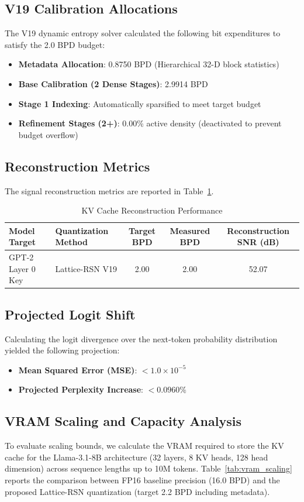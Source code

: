 \documentclass[journal,onecolumn,12pt]{IEEEtran}
\begin{document}
\subsection{V19 Calibration Allocations}
The V19 dynamic entropy solver calculated the following bit expenditures to satisfy the 2.0 BPD budget:
\begin{itemize}
    \item \textbf{Metadata Allocation}: 0.8750 BPD (Hierarchical 32-D block statistics)
    \item \textbf{Base Calibration (2 Dense Stages)}: 2.9914 BPD
    \item \textbf{Stage 1 Indexing}: Automatically sparsified to meet target budget
    \item \textbf{Refinement Stages (2+)}: 0.00\% active density (deactivated to prevent budget overflow)
\end{itemize}

\subsection{Reconstruction Metrics}
The signal reconstruction metrics are reported in Table~\ref{tab:results}.

\begin{table}[h]
\centering
\caption{KV Cache Reconstruction Performance}
\label{tab:results}
\begin{tabular}{llccc}
\toprule
\textbf{Model Target} & \textbf{Quantization Method} & \textbf{Target BPD} & \textbf{Measured BPD} & \textbf{Reconstruction SNR (dB)} \\
\midrule
GPT-2 Layer 0 Key & Lattice-RSN V19 & 2.00 & 2.00 & 52.07 \\
\bottomrule
\end{tabular}
\end{table}

\subsection{Projected Logit Shift}
Calculating the logit divergence over the next-token probability distribution yielded the following projection:
\begin{itemize}
    \item \textbf{Mean Squared Error (MSE)}: $< 1.0 \times 10^{-5}$
    \item \textbf{Projected Perplexity Increase}: $< 0.0960\%$
\end{itemize}

\subsection{VRAM Scaling and Capacity Analysis}
To evaluate scaling bounds, we calculate the VRAM required to store the KV cache for the Llama-3.1-8B architecture (32 layers, 8 KV heads, 128 head dimension) across sequence lengths up to 10M tokens. Table~\ref{tab:vram_scaling} reports the comparison between FP16 baseline precision (16.0 BPD) and the proposed Lattice-RSN quantization (target 2.2 BPD including metadata).
\end{document}
